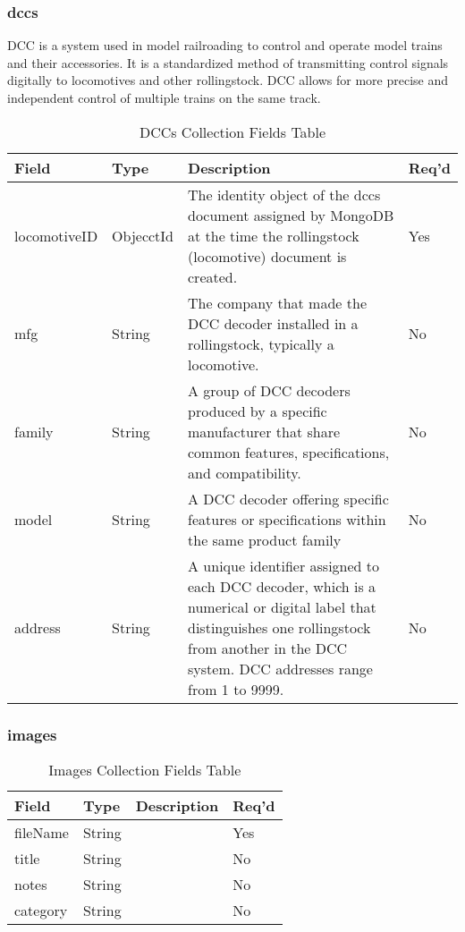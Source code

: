 \subsubsection{dccs}
\ac{DCC} is a system used in model railroading to control and operate model trains and their accessories. It is a standardized method of transmitting control signals digitally to locomotives and other rollingstock. \ac{DCC} allows for more precise and independent control of multiple trains on the same track.
\begin{table}[H]
    \begin{tabular}{|L{3cm}|L{1.7cm}|L{8.8cm}|L{1.3cm}|}
    \hline
        \textbf{Field} & \textbf{Type} & \textbf{Description} & \textbf{Req'd} \\ \hline
        locomotiveID & ObjecctId &  The identity object of the dccs document assigned by MongoDB at the time the rollingstock (locomotive) document is created.& Yes \\ \hline
        mfg & String & The company that made the \ac{DCC} decoder installed in a rollingstock, typically a locomotive. & No\\ \hline
        family & String & A group of DCC decoders produced by a specific manufacturer that share common features, specifications, and compatibility. & No \\ \hline
        model &  String & A \ac{DCC} decoder offering specific features or specifications within the same product family& No \\ \hline
        address & String & A unique identifier assigned to each \ac{DCC} decoder, which is a numerical or digital label that distinguishes one rollingstock from another in the \ac{DCC} system. \ac{DCC} addresses range from 1 to 9999. & No \\ \hline
    \end{tabular}
    \caption{\label{dcc-table}\ac{DCC}s Collection Fields Table}
\end{table}
\subsubsection{images}
\begin{table}[H]
    \begin{tabular}{|L{3cm}|L{1.7cm}|L{8.8cm}|L{1.3cm}|}
    \hline
        \textbf{Field} & \textbf{Type} & \textbf{Description} & \textbf{Req'd} \\ \hline
        fileName & String &  & Yes \\ \hline
        title & String & & No\\ \hline
        notes & String & & No \\ \hline
        category &  String & & No \\ \hline
    \end{tabular}
    \caption{\label{image-table}Images Collection Fields Table}
    \end{table}
